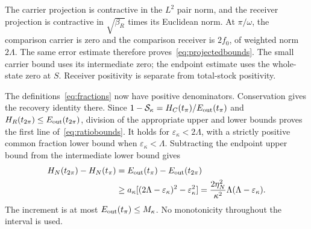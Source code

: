 The carrier projection is contractive in the $L^2$ pair norm, and the receiver projection is contractive in $\sqrt{\beta_R}$ times its Euclidean norm. At $\pi/\omega$, the comparison carrier is zero and the comparison receiver is $2f_0$, of weighted norm $2\Lambda$. The same error estimate therefore proves~\eqref{eq:projectedbounds}. The small carrier bound uses its intermediate zero; the endpoint estimate uses the whole-state zero at $S$. Receiver positivity is separate from total-stock positivity.

The definitions~\eqref{eq:fractions} now have positive denominators. Conservation gives the recovery identity there. Since $1-\mathcal S_\kappa=H_C(t_\pi)/E_{\rm out}(t_\pi)$ and $H_R(t_{2\pi})\le E_{\rm out}(t_{2\pi})$, division of the appropriate upper and lower bounds proves the first line of~\eqref{eq:ratiobounds}. It holds for $\varepsilon_\kappa<2\Lambda$, with a strictly positive common fraction lower bound when $\varepsilon_\kappa<\Lambda$. Subtracting the endpoint upper bound from the intermediate lower bound gives
\begin{equation}\label{eq:recoverysubtraction}%
\begin{aligned}
H_N(t_{2\pi})-H_N(t_\pi)
&=E_{\rm out}(t_\pi)-E_{\rm out}(t_{2\pi})\\
&\ge a_\kappa[(2\Lambda-\varepsilon_\kappa)^2-\varepsilon_\kappa^2]
=\frac{2\eta_N^2}{\kappa^2}\Lambda(\Lambda-\varepsilon_\kappa).
\end{aligned}
\end{equation}
The increment is at most $E_{\rm out}(t_\pi)\le M_\kappa$. No monotonicity throughout the interval is used.


